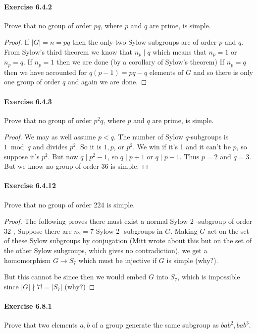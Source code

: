 \documentclass{article}
\begin{document}
\paragraph{Exercise 6.4.2} Prove that no group of order $p q$, where $p$ and $q$ are prime, is simple.
\begin{proof}
    If $|G|=n=p q$ then the only two Sylow subgroups are of order $p$ and $q$.
From Sylow's third theorem we know that $n_p \mid q$ which means that $n_p=1$ or $n_p=q$.
If $n_p=1$ then we are done (by a corollary of Sylow's theorem)
If $n_p=q$ then we have accounted for $q(p-1)=p q-q$ elements of $G$ and so there is only one group of order $q$ and again we are done.
\end{proof}



\paragraph{Exercise 6.4.3} Prove that no group of order $p^2 q$, where $p$ and $q$ are prime, is simple.
\begin{proof}
    We may as well assume $p<q$. The number of Sylow $q$-subgroups is $1 \bmod q$ and divides $p^2$. So it is $1, p$, or $p^2$. We win if it's 1 and it can't be $p$, so suppose it's $p^2$. But now $q \mid p^2-1$, so $q \mid p+1$ or $q \mid p-1$.
Thus $p=2$ and $q=3$. But we know no group of order 36 is simple. 
\end{proof}



\paragraph{Exercise 6.4.12} Prove that no group of order 224 is simple.
\begin{proof}
    The following proves there must exist a normal Sylow 2 -subgroup of order 32 ,
Suppose there are $n_2=7$ Sylow 2 -subgroups in $G$. Making $G$ act on the set of these Sylow subgroups by conjugation (Mitt wrote about this but on the set of the other Sylow subgroups, which gives no contradiction), we get a homomorphism $G \rightarrow S_7$ which must be injective if $G$ is simple (why?).

But this cannot be since then we would embed $G$ into $S_7$, which is impossible since $|G| \nmid 7 !=\left|S_7\right|$ (why?)
\end{proof}



\paragraph{Exercise 6.8.1} Prove that two elements $a, b$ of a group generate the same subgroup as $b a b^2, b a b^3$.
\end{document}

